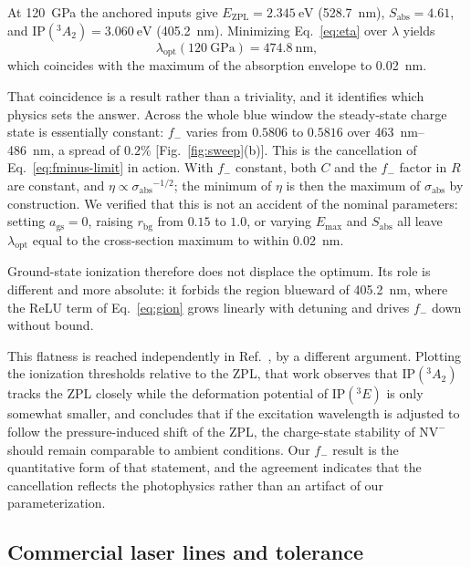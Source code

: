 \documentclass[preprint,12pt]{elsarticle}
\newcommand{\NVm}{\ensuremath{\mathrm{NV}^{-}}}
\newcommand{\gsA}{\ensuremath{^{3}\!A_{2}}}
\newcommand{\esE}{\ensuremath{^{3}\!E}}
\newcommand{\sabs}{\ensuremath{\sigma_{\mathrm{abs}}}}
\newcommand{\fm}{\ensuremath{f_{-}}}
\newcommand{\lopt}{\ensuremath{\lambda_{\mathrm{opt}}}}
\begin{document}
At \SI{120}{\giga\pascal} the anchored inputs give $E_{\mathrm{ZPL}} =
\SI{2.345}{\electronvolt}$ (\SI{528.7}{\nano\meter}), $S_{\mathrm{abs}} = 4.61$,
and $\mathrm{IP}(\gsA) = \SI{3.060}{\electronvolt}$ (\SI{405.2}{\nano\meter}).
Minimizing Eq.~\eqref{eq:eta} over $\lambda$ yields
\begin{equation}
  \lopt(\SI{120}{\giga\pascal}) = \SI{474.8}{\nano\meter},
\end{equation}
which coincides with the maximum of the absorption envelope to
\SI{0.02}{\nano\meter}.

That coincidence is a result rather than a triviality, and it identifies which
physics sets the answer. Across the whole blue window the steady-state charge
state is essentially constant: $\fm$ varies from $0.5806$ to $0.5816$ over
\SIrange{463}{486}{\nano\meter}, a spread of $0.2\%$
[Fig.~\ref{fig:sweep}(b)]. This is the cancellation of
Eq.~\eqref{eq:fminus-limit} in action. With $\fm$ constant, both $C$ and the
$\fm$ factor in $R$ are constant, and $\eta \propto \sabs^{-1/2}$; the minimum of
$\eta$ is then the maximum of $\sabs$ by construction. We verified that this is
not an accident of the nominal parameters: setting $a_{\mathrm{gs}} = 0$,
raising $r_{\mathrm{bg}}$ from $0.15$ to $1.0$, or varying $E_{\max}$ and
$S_{\mathrm{abs}}$ all leave $\lopt$ equal to the cross-section maximum to within
\SI{0.02}{\nano\meter}.

Ground-state ionization therefore does not displace the optimum. Its role is
different and more absolute: it forbids the region blueward of
\SI{405.2}{\nano\meter}, where the ReLU term of Eq.~\eqref{eq:gion} grows
linearly with detuning and drives $\fm$ down without bound.

This flatness is reached independently in Ref.~\cite{Ho2026}, by a different
argument. Plotting the ionization thresholds relative to the ZPL, that work
observes that $\mathrm{IP}(\gsA)$ tracks the ZPL closely while the deformation
potential of $\mathrm{IP}(\esE)$ is only somewhat smaller, and concludes that if
the excitation wavelength is adjusted to follow the pressure-induced shift of the
ZPL, the charge-state stability of \NVm{} should remain comparable to ambient
conditions. Our $\fm$ result is the quantitative form of that statement, and the
agreement indicates that the cancellation reflects the photophysics rather than
an artifact of our parameterization.

\subsection{Commercial laser lines and tolerance}
\end{document}
